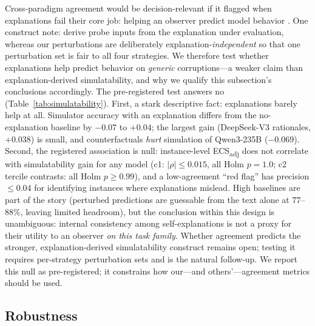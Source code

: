 \documentclass[11pt]{article}
\newcommand{\ecsadj}{\mbox{ECS\textsubscript{adj}}}
\begin{document}
Cross-paradigm agreement would be decision-relevant if it flagged when explanations fail their core job: helping an observer predict model behavior \citep{chen2024models}. One construct note: \citet{chen2024models} derive probe inputs from the explanation under evaluation, whereas our perturbations are deliberately explanation-\emph{independent} so that one perturbation set is fair to all four strategies. We therefore test whether explanations help predict behavior on \emph{generic} corruptions---a weaker claim than explanation-derived simulatability, and why we qualify this subsection's conclusions accordingly. The pre-registered test answers no (Table~\ref{tab:simulatability}). First, a stark descriptive fact: explanations barely help at all. Simulator accuracy with an explanation differs from the no-explanation baseline by $-0.07$ to $+0.04$; the largest gain (DeepSeek-V3 rationales, $+0.038$) is small, and counterfactuals \emph{hurt} simulation of Qwen3-235B ($-0.069$). Second, the registered association is null: instance-level \ecsadj{} does not correlate with simulatability gain for any model (c1: $|\rho|\le0.015$, all Holm $p{=}1.0$; c2 tercile contrasts: all Holm $p\ge0.99$), and a low-agreement ``red flag'' has precision $\le 0.04$ for identifying instances where explanations mislead. High baselines are part of the story (perturbed predictions are guessable from the text alone at $77$--$88\%$, leaving limited headroom), but the conclusion within this design is unambiguous: internal consistency among self-explanations is not a proxy for their utility to an observer \emph{on this task family}. Whether agreement predicts the stronger, explanation-derived simulatability construct remains open; testing it requires per-strategy perturbation sets and is the natural follow-up. We report this null as pre-registered; it constrains how our---and others'---agreement metrics should be used.

\subsection{Robustness}
\label{sec:robustness}
\end{document}
